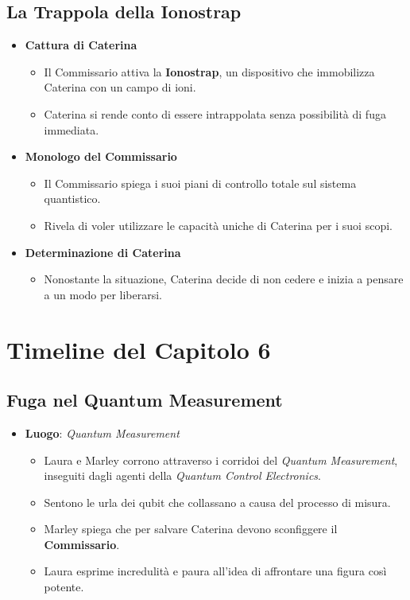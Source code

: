 \subsection*{La Trappola della Ionostrap}

\begin{itemize}
    \item \textbf{Cattura di Caterina}
    \begin{itemize}
        \item Il Commissario attiva la \textbf{Ionostrap}, un dispositivo che immobilizza Caterina con un campo di ioni.
        \item Caterina si rende conto di essere intrappolata senza possibilità di fuga immediata.
    \end{itemize}

    \item \textbf{Monologo del Commissario}
    \begin{itemize}
        \item Il Commissario spiega i suoi piani di controllo totale sul sistema quantistico.
        \item Rivela di voler utilizzare le capacità uniche di Caterina per i suoi scopi.
    \end{itemize}

    \item \textbf{Determinazione di Caterina}
    \begin{itemize}
        \item Nonostante la situazione, Caterina decide di non cedere e inizia a pensare a un modo per liberarsi.
    \end{itemize}
\end{itemize}

\section*{Timeline del Capitolo 6}

\subsection*{Fuga nel Quantum Measurement}

\begin{itemize}
    \item \textbf{Luogo}: \emph{Quantum Measurement}
    \begin{itemize}
        \item Laura e Marley corrono attraverso i corridoi del \emph{Quantum Measurement}, inseguiti dagli agenti della \emph{Quantum Control Electronics}.
        \item Sentono le urla dei qubit che collassano a causa del processo di misura.
        \item Marley spiega che per salvare Caterina devono sconfiggere il \textbf{Commissario}.
        \item Laura esprime incredulità e paura all'idea di affrontare una figura così potente.
    \end{itemize}
\end{itemize}

